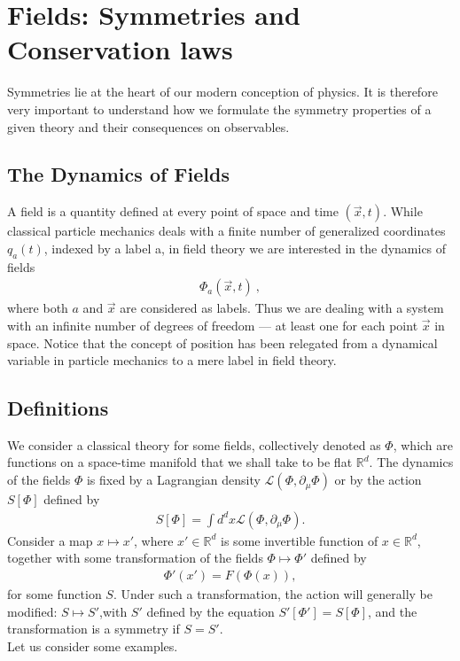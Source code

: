 \documentclass[12pt,a4paper]{report}
\begin{document}
\section{Fields: Symmetries and Conservation laws}
Symmetries lie at the heart of our modern conception of physics. It is therefore very important to understand how we formulate the symmetry properties of a given theory and their consequences on observables. \cite{Antonin}
\subsection{The Dynamics of Fields}
A field is a quantity defined at every point of space and time $(\vec{x}, t)$. While classical particle mechanics deals with a finite number of generalized coordinates $q_a(t)$, indexed by a label a, in field theory we are interested in the dynamics of fields \cite{david}
\begin{align}
    \Phi_a(\vec{x},t)~,
\end{align}
where both $a$ and $\vec{x}$ are considered as labels. Thus we are dealing with a system with an infinite number of degrees of freedom — at least one for each point $\vec{x}$ in space. Notice that the concept of position has been relegated from a dynamical variable in particle mechanics to a mere label in field theory.

\subsection{Definitions}
We consider a classical theory for some fields, collectively denoted as $\Phi$, which are functions on a space-time manifold that we shall take to be flat $\mathbb{R}^d$. The dynamics of the fields $\Phi$ is fixed by a Lagrangian density $\mathcal{L}(\Phi,\partial_\mu \Phi)$ or by the action $S[\Phi]$ defined by \cite{Antonin}
\begin{align}
    S[\Phi]=\int d^d x \mathcal{L}(\Phi,\partial_\mu \Phi).
\end{align}
Consider a map $x\longmapsto x'$, where $x'\in\mathbb{R}^d$ is some invertible function of $x\in\mathbb{R}^d$, together with some
transformation of the fields $\Phi\longmapsto \Phi'$ defined by
\begin{align}
    \Phi'(x')=F(\Phi(x)),
\end{align}
for some function $S$. Under such a transformation, the action will generally be modified: $S\longmapsto S'$,with $S'$ defined by the equation $S'[\Phi']=S[\Phi]$, and the transformation is a symmetry if $S=S'$.\\
Let us consider some examples.
\end{document}
